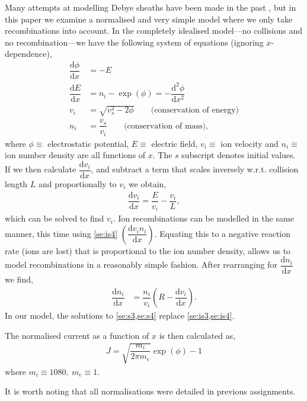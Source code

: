 \documentclass[aip,apl,reprint]{revtex4-1}
\newcommand{\difx}[1]{\dfrac{\mathrm{d}#1}{\mathrm{d}x}}
\newcommand{\ddifx}[1]{\dfrac{\mathrm{d}^{2}#1}{\mathrm{d}x^{2}}}
\begin{document}
	Many attempts at modelling Debye sheaths have been made in the past \cite{lpcs, md}, but in this paper we examine a normalised and very simple \cite{theory} model where we only take recombinations into account. In the completely idealised model---no collisions and no recombination---we have the following system of equations (ignoring $x$-dependence),
	\begin{subequations}
		\begin{align}
			\difx{\phi} &= -E \label{se:is1}\\
			\difx{E} &= n_{i} - \exp(\phi) = - \ddifx{\phi} \label{se:is2}\\
			v_{i} &= \sqrt{v_{s}^{2} - 2 \phi} \qquad \textrm{(conservation of energy)}\label{se:is3}\\
			n_{i} &= \dfrac{v_{s}}{v_{i}} \qquad \textrm{(conservation of mass)}\label{se:is4},
		\end{align}
	\end{subequations}
	where $\phi \equiv$ electrostatic potential, $E \equiv$ electric field, $v_{i} \equiv$ ion velocity and $n_{i} \equiv$ ion number density are all functions of $x$. The $s$ subscript denotes initial values. If we then calculate $\difx{v_{i}}$, and subtract a term that scales inversely w.r.t. collision length $L$ and proportionally to $v_{i}$ we obtain,
	\begin{align}
		\difx{v_{i}} = \dfrac{E}{v_{i}} - \dfrac{v_{i}}{L},\label{se:s3}
	\end{align}
	which can be solved to find $v_{i}$. Ion recombinations can be modelled in the same manner, this time using \cref{se:is4} $\left(\difx{v_{i} n_{i}}\right)$. Equating this to a negative reaction rate (ions are lost) that is proportional to the ion number density, allows us to model recombinations in a reasonably simple fashion. After rearranging for $\difx{n_{i}}$ we find,
	\begin{align}
		\difx{n_{i}} &= \dfrac{n_{i}}{v_{i}} \left(R - \difx{v_{i}}\right).\label{se:s4}
	\end{align}
	In our model, the solutions to \cref{se:s3,se:s4} replace \cref{se:is3,se:is4}.
	
	The normalised current as a function of $x$ is then calculated as,
	\begin{align}
		J = \sqrt{\dfrac{m_{i}}{2\pi m_{e}}} \exp(\phi) - 1 \label{s:curr}
	\end{align}
	where $m_{i} \equiv 1080,~m_{e} \equiv 1$.
	
	It is worth noting that all normalisations were detailed in previous assignments.
\end{document}
